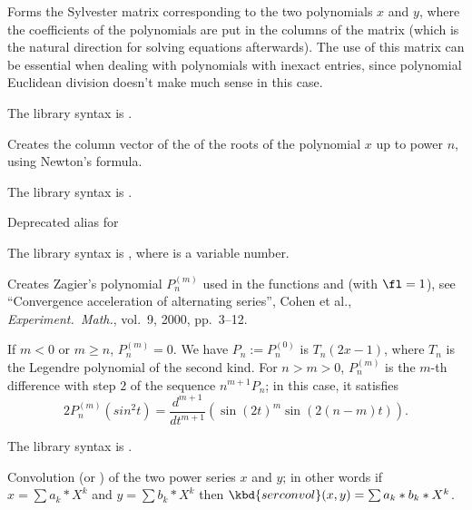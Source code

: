 \label{se:polsylvestermatrix}
Forms the Sylvester matrix
corresponding to the two polynomials $x$ and $y$, where the coefficients of
the polynomials are put in the columns of the matrix (which is the natural
direction for solving equations afterwards). The use of this matrix can be
essential when dealing with polynomials with inexact entries, since
polynomial Euclidean division doesn't make much sense in this case.

The library syntax is .

\label{se:polsym}
Creates the column vector of the  of the roots of the
polynomial $x$ up to power $n$, using Newton's formula.

The library syntax is .

\label{se:poltchebi}
Deprecated alias for 

The library syntax is , where  is a variable number.

\label{se:polzagier}
Creates Zagier's polynomial $P_n^{(m)}$ used in
the functions  and  (with $\fl=1$), see
``Convergence acceleration of alternating series'', Cohen et al.,
\emph{Experiment.~Math.}, vol.~9, 2000, pp.~3--12.

If $m < 0$ or $m \ge n$, $P_n^{(m)} = 0$.
We have
$P_n := P_n^{(0)}$ is $T_n(2x-1)$, where $T_n$ is the Legendre polynomial of
the second kind. For $n > m > 0$, $P_n^{(m)}$ is the $m$-th difference with
step $2$ of the sequence $n^{m+1}P_n$; in this case, it satisfies
$$2 P_n^{(m)}(sin^2 t) = \dfrac{d^{m+1}}{dt^{m+1}}(\sin(2t)^m \sin(2(n-m)t)).$$


The library syntax is .

\label{se:serconvol}
Convolution (or ) of the
two power series $x$ and $y$; in other words if $x=\sum a_k*X^k$ and $y=\sum
b_k*X^k$ then $\kbd{serconvol}(x,y)=\sum a_k*b_k*X^k$.

